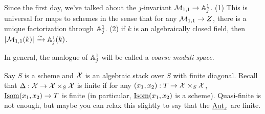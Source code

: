

Since the first day, we've talked about the $j$-invariant
$\M_{1,1}\to \AA^1_j$. (1) This is universal for maps to schemes in
the sense that for any $\M_{1,1}\to Z$, there is a unique
factorization through $\AA^1_j$. (2) if $k$ is an algebraically
closed field, then $|\M_{1,1}(k)|\xrightarrow{\sim} \AA^1_j(k)$.

In general, the analogue of $\AA^1_j$ will be called a \emph{coarse
moduli space}.

Say $S$ is a scheme and $\X$ is an algebraic stack over $S$
 with finite diagonal. Recall that $\Delta:\X\to \X\times_S
\X$ is finite if for any $(x_1,x_2):T\to \X\times_S \X$,
$\isom(x_1,x_2)\to T$ is finite (in particular, $\isom(x_1,x_2)$ is a
scheme). Quasi-finite is not enough, but maybe you can relax this
slightly to say that the $\aut_x$ are finite.

